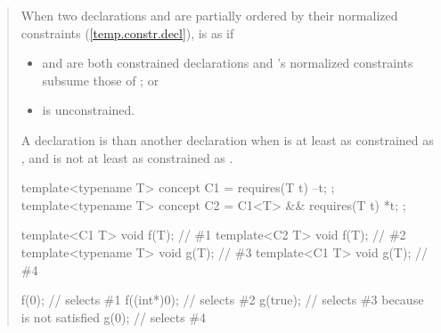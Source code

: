 \begin{quote}
\begin{addedblock}
\pnum
When two declarations  and  are
partially ordered by their normalized constraints (\ref{temp.constr.decl}), 
 is  as  if
% 
\begin{itemize}
\item {} and  are both constrained declarations and 
's normalized constraints subsume those of ; or

\item {} is unconstrained.
\end{itemize}

\pnum
A declaration  is 
than another declaration  when  is at least as
constrained as , and  is not at least as
constrained as .

\enterexample
\begin{codeblock}
template<typename T> concept C1 = requires(T t) { --t; };
template<typename T> concept C2 = C1<T> && requires(T t) { *t; };

template<C1 T> void f(T);       // \#1
template<C2 T> void f(T);       // \#2
template<typename T> void g(T); // \#3
template<C1 T> void g(T);       // \#4

f(0);       // selects \#1
f((int*)0); // selects \#2
g(true);    // selects \#3 because  is not satisfied
g(0);       // selects \#4
\end{codeblock}
\exitexample

\end{addedblock}
\end{quote}
